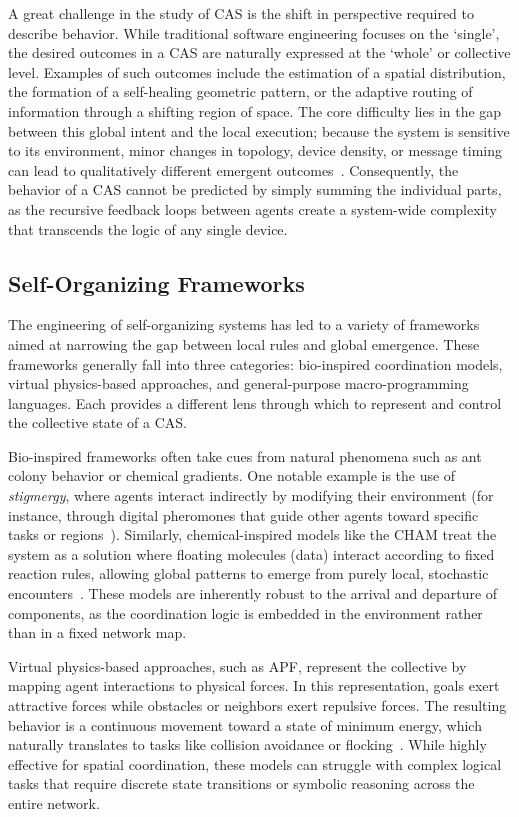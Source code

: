 A great challenge in the study of \ac{CAS} is the shift in perspective required to describe behavior. While traditional software engineering focuses on the `single', the desired outcomes in a \ac{CAS} are naturally expressed at the `whole' or collective level. Examples of such outcomes include the estimation of a spatial distribution, the formation of a self-healing geometric pattern, or the adaptive routing of information through a shifting region of space. The core difficulty lies in the gap between this global intent and the local execution; because the system is sensitive to its environment, minor changes in topology, device density, or message timing can lead to qualitatively different emergent outcomes~\cite{BealIEEEComputer2015}. Consequently, the behavior of a \ac{CAS} cannot be predicted by simply summing the individual parts, as the recursive feedback loops between agents create a system-wide complexity that transcends the logic of any single device.

\subsection{Self-Organizing Frameworks}

The engineering of self-organizing systems has led to a variety of frameworks aimed at narrowing the gap between local rules and global emergence. These frameworks generally fall into three categories: bio-inspired coordination models, virtual physics-based approaches, and general-purpose macro-programming languages. Each provides a different lens through which to represent and control the collective state of a \ac{CAS}.

Bio-inspired frameworks often take cues from natural phenomena such as ant colony behavior or chemical gradients. One notable example is the use of \emph{stigmergy}, where agents interact indirectly by modifying their environment (for instance, through digital pheromones that guide other agents toward specific tasks or regions~\cite{DBLP:journals/computer/GardelliVZ08}). Similarly, chemical-inspired models like the \ac{CHAM} treat the system as a solution where floating molecules (data) interact according to fixed reaction rules, allowing global patterns to emerge from purely local, stochastic encounters~\cite{DBLP:journals/tcs/BerryB92}. These models are inherently robust to the arrival and departure of components, as the coordination logic is embedded in the environment rather than in a fixed network map.

Virtual physics-based approaches, such as \ac{APF}, represent the collective by mapping agent interactions to physical forces. In this representation, goals exert attractive forces while obstacles or neighbors exert repulsive forces. The resulting behavior is a continuous movement toward a state of minimum energy, which naturally translates to tasks like collision avoidance or flocking~\cite{DBLP:journals/ijrr/Khatib86}. While highly effective for spatial coordination, these models can struggle with complex logical tasks that require discrete state transitions or symbolic reasoning across the entire network.

